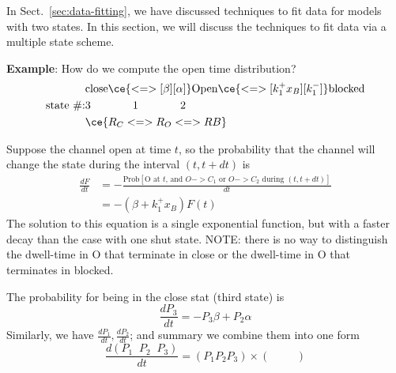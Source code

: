 In Sect.~\ref{sec:data-fitting}, we have discussed techniques to fit
data for models with two states. In this section, we will discuss the
techniques to fit data via a multiple state scheme.

{\bf Example}: How do we compute the open time distribution?
\begin{equation}
  \label{eq:854}
  \begin{split}
    &\text{close} \ce{<=>[\beta][\alpha]}  \text{Open}
    \ce{<=>[k^+_1x_B][k^-_1]}\text{blocked} \\
    \text{state \#:} &\text{3 \hspace{1.1cm}    1  \hspace{1.1cm}    2 } \\
    &\ce{R_C <=> R_O <=> RB}
  \end{split}
\end{equation}

Suppose the channel open at time $t$, so the probability that the
channel will change the state during the interval $(t,t+dt)$ is
\begin{equation}
  \label{eq:859}
  \begin{split}
    \frac{dF}{dt} &= -\frac{\text{Prob}[\text{O at $t$, and $O->C_1$ or
        $O->C_2$ during $(t,t+dt)$}]}{dt} \\
    &= -(\beta + k^+_1x_B) F(t)
  \end{split}
\end{equation}
The solution to this equation is a single exponential function, but
with a faster decay than the case with one shut state. NOTE: there is
no way to distinguish the dwell-time in O that terminate in close or
the dwell-time in O that terminates in blocked.

The probability for being in the close stat (third state) is
\begin{equation}
  \label{eq:860}
  \frac{dP_3}{dt} = -P_3 \beta +  P_2 \alpha
\end{equation}
Similarly, we have $\frac{dP_1}{dt}, \frac{dP_2}{dt}$; and summary we
combine them into one form
\begin{equation}
  \label{eq:861}
  \frac{d(P_1 \;\; P_2 \;\; P_3)}{dt} = (P_1 P_2 P_3) \times \left(
    \begin{array}{ccc}
      & &
    \end{array}
    \right)
\end{equation}

